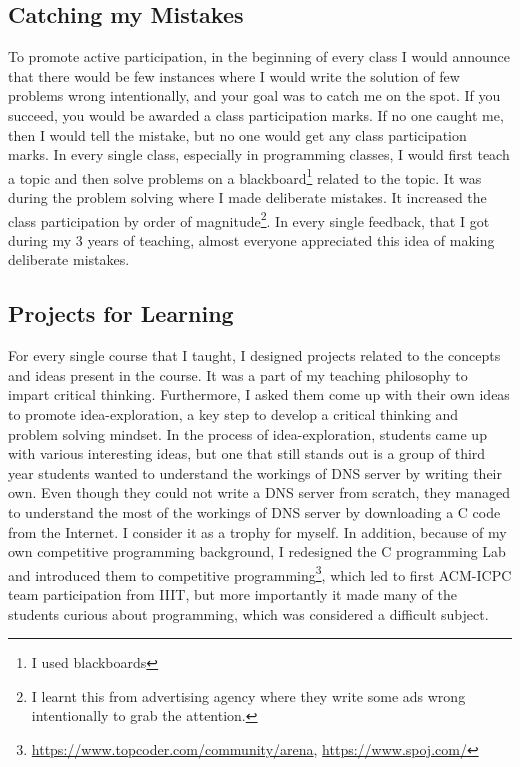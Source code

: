 \documentclass[a4paper]{article}
\begin{document}
\subsection{Catching my Mistakes}
To promote active participation, in the beginning of every class 
I would announce that there would be 
few instances where I would write the solution of few problems wrong intentionally, 
and your goal was to catch me on the spot. If you succeed, you would be awarded 
a class participation marks. If no one caught me, 
then I would tell the mistake, but no one would get any 
class participation marks. In every single class, especially in programming classes, 
I would first teach a topic and then solve problems on 
a blackboard\footnote{I used blackboards} related to the topic. 
It was during the problem solving where I made deliberate mistakes.
It increased the class participation by order of 
magnitude\footnote{I learnt this 
from advertising agency where they write some ads wrong 
intentionally to grab the attention.}. In every single 
feedback, that I got during my 3 years of teaching, 
almost everyone appreciated this idea of making deliberate mistakes. 



\subsection{Projects for Learning}
For every single course that I taught, I designed projects related to the concepts 
and ideas present in the course. It was a part of my teaching philosophy to impart 
critical thinking. Furthermore, I asked them come up with their own ideas to 
promote idea-exploration, a key step to develop a critical thinking and problem solving mindset. 
In the process of idea-exploration, students came up with various interesting 
ideas, but one that still stands out is a group of third year students wanted 
to understand the workings of DNS server by writing their own. Even though they 
could not write a DNS server from scratch, they managed to understand the 
most of the workings of DNS server by downloading a C code from the Internet. 
I consider it as a trophy for myself. In addition, because of my own 
competitive programming background, 
I redesigned the C programming Lab and introduced them to competitive 
programming\footnote{\url{https://www.topcoder.com/community/arena}, 
\url{https://www.spoj.com/}}, which led to first ACM-ICPC team participation 
from IIIT, but more importantly it made many of the students curious about 
programming, which was considered a difficult subject.
\end{document}
